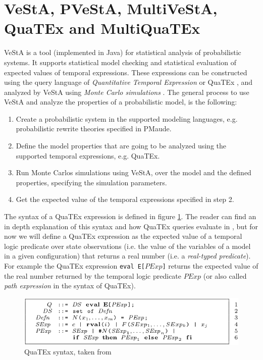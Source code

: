 \section{VeStA, PVeStA, MultiVeStA, QuaTEx and MultiQuaTEx}
VeStA \cite{Vesta} is a tool (implemented in Java) for statistical analysis of probabilistic systems. It supports statistical model checking and statistical evaluation of expected values of temporal expressions. These expressions can be constructed using the query language of  \textit{Quantitative Temporal Expression} or QuaTEx \cite{Agha2006}, and analyzed by VeStA using \textit{Monte Carlo simulations} . 
The general process to use VeStA and analyze the properties of a probabilistic model, is the following:
\begin{enumerate}
    \item Create a probabilistic system in the supported modeling languages, e.g. probabilistic rewrite theories specified in PMaude.
    \item Define the model properties that are going to be analyzed using the supported temporal expressions, e.g. QuaTEx.
    \item Run Monte Carlos simulations using VeStA, over the model and the defined properties, specifying the simulation parameters.
    \item Get the expected value of the temporal expressions specified in step 2.
\end{enumerate}
The syntax of a QuaTEx expression is defined in figure \ref{fig:multivesta}. The reader can find an in depth explanation of this syntax and how QuaTEx queries evaluate in \cite{Agha2006,multivesta}, but for now we will define a QuaTEx expression as the expected value of a temporal logic predicate over state observations (i.e. the value of the variables of a model in a given configuration) that returns a real number (i.e. a \textit{real-typed predicate}). For example the QuaTEx expression \texttt{eval E[$PExp$]} returns the expected value of the real number returned by the temporal logic predicate $PExp$ (or also called \textit{path expression} in the syntax of QuaTEx).  
\begin{figure}[h]
    \centering
    \includegraphics[scale = 0.4]{images/quatex1.png}
    \caption{QuaTEx syntax, taken from \cite{multivesta}}
    \label{fig:multivesta}
\end{figure}

